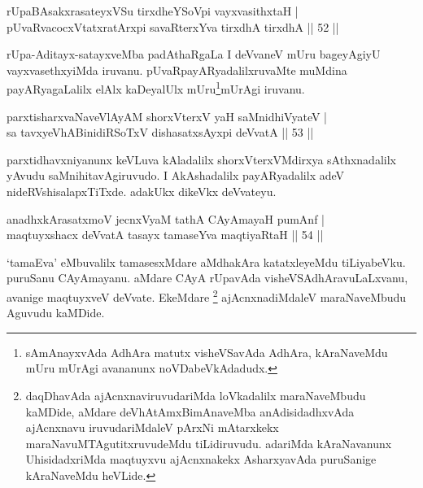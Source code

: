 
\begin{shl}
rUpaBAsakxrasateyxVSu tirxdheYSoV\s pi vayxvasithxtaH |\\
pUvaRvacocxVtatxratArxpi savaRterxYva tirxdhA tirxdhA \hfill || 52 ||
\end{shl}

\begin{artha}
rUpa-Aditayx-satayxveMba padAthaRgaLa I deVvaneV mUru bageyAgiyU vayxvasethxyiMda iruvanu. pUvaRpayARyadalilxruvaMte muMdina payARyagaLalilx elAlx kaDeyalUlx mUru\footnote[2]{sAmAnayxvAda AdhAra matutx visheVSavAda AdhAra, kAraNaveMdu mUru mUrAgi avananunx noVDabeVkAdadudx.}mUrAgi iruvanu.
\end{artha}


\begin{shl}
parxtisharxvaNaveVlAyAM shorxVterxV yaH saMnidhiVyateV |\\
sa tavxyeVhABinidiRSoTxV dishasatxsAyxpi deVvatA \hfill || 53 ||
\end{shl}

\begin{artha}
parxtidhavxniyanunx keVLuva kAladalilx shorxVterxVMdirxya sAthxnadalilx yAvudu saMnihitavAgiruvudo. I AkAshadalilx payARyadalilx adeV nideRVshisalapxTiTxde. adakUkx dikeVkx deVvateyu.
\end{artha}

\begin{shl}
anadhxkArasatxmoV jecnxVyaM tathA CAyAmayaH pumAnf |\\
maqtuyxshacx deVvatA tasayx tamaseYva maqtiyaRtaH \hfill || 54 ||
\end{shl}

\begin{artha}%
`tamaEva' eMbuvalilx tamasesxMdare aMdhakAra katatxleyeMdu tiLiyabeVku. puruSanu CAyAmayanu. aMdare CAyA rUpavAda visheVSAdhAravuLaLxvanu, avanige maqtuyxveV deVvate. EkeMdare \footnote[1]{daqDhavAda ajAcnxnaviruvudariMda loVkadalilx maraNaveMbudu kaMDide, aMdare deVhAtAmxBimAnaveMba anAdisidadhxvAda ajAcnxnavu iruvudariMdaleV pArxNi mAtarxkekx maraNavuMTAgutitxruvudeMdu tiLidiruvudu. adariMda kAraNavanunx UhisidadxriMda maqtuyxvu ajAcnxnakekx AsharxyavAda puruSanige kAraNaveMdu heVLide.} ajAcnxnadiMdaleV maraNaveMbudu Aguvudu kaMDide.
\end{artha}


